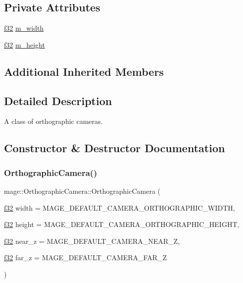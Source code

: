 \subsection*{Private Attributes}
\begin{DoxyCompactItemize}
\item 
\hyperlink{namespacemage_a6a44ad388483959dc4dff9f2aef91431}{f32} \hyperlink{classmage_1_1_orthographic_camera_a8ef5fb497ae0ae764f3d3cd55b8cc81c}{m\+\_\+width}
\item 
\hyperlink{namespacemage_a6a44ad388483959dc4dff9f2aef91431}{f32} \hyperlink{classmage_1_1_orthographic_camera_a93edbe29954eef431d847183af4648cd}{m\+\_\+height}
\end{DoxyCompactItemize}
\subsection*{Additional Inherited Members}


\subsection{Detailed Description}
A class of orthographic cameras. 

\subsection{Constructor \& Destructor Documentation}
\hypertarget{classmage_1_1_orthographic_camera_a36c301d886a0e823f6f6a846c0c419d8}{}\label{classmage_1_1_orthographic_camera_a36c301d886a0e823f6f6a846c0c419d8} 
\subsubsection{\texorpdfstring{Orthographic\+Camera()}{OrthographicCamera()}\hspace{0.1cm}{\footnotesize\ttfamily [1/3]}}
{\footnotesize\ttfamily mage\+::\+Orthographic\+Camera\+::\+Orthographic\+Camera (\begin{DoxyParamCaption}\item[{\hyperlink{namespacemage_a6a44ad388483959dc4dff9f2aef91431}{f32}}]{width = {\ttfamily MAGE\+\_\+DEFAULT\+\_\+CAMERA\+\_\+ORTHOGRAPHIC\+\_\+WIDTH},  }\item[{\hyperlink{namespacemage_a6a44ad388483959dc4dff9f2aef91431}{f32}}]{height = {\ttfamily MAGE\+\_\+DEFAULT\+\_\+CAMERA\+\_\+ORTHOGRAPHIC\+\_\+HEIGHT},  }\item[{\hyperlink{namespacemage_a6a44ad388483959dc4dff9f2aef91431}{f32}}]{near\+\_\+z = {\ttfamily MAGE\+\_\+DEFAULT\+\_\+CAMERA\+\_\+NEAR\+\_\+Z},  }\item[{\hyperlink{namespacemage_a6a44ad388483959dc4dff9f2aef91431}{f32}}]{far\+\_\+z = {\ttfamily MAGE\+\_\+DEFAULT\+\_\+CAMERA\+\_\+FAR\+\_\+Z} }\end{DoxyParamCaption})\hspace{0.3cm}{\ttfamily [explicit]}}

